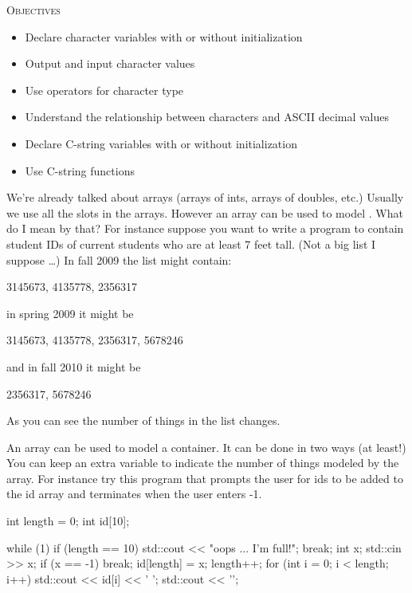 \newpage{}

\textsc{Objectives}
\begin{itemize}
\item Declare character variables with or without initialization
\item Output and input character values
\item Use operators for character type
\item Understand the relationship between characters and ASCII decimal values
\item Declare C-string variables with or without initialization
\item Use C-string functions
\end{itemize}


\newpage{}

We're already talked about arrays (arrays of ints, arrays of doubles, etc.) Usually we use all the slots in the arrays. However an array can be used to model . What do I mean by that? For instance suppose you want to write a program to contain student IDs of current students who are at least 7 feet tall. (Not a big list I suppose \ldots) In fall 2009 the list might contain:

\begin{center}
3145673, 4135778, 2356317
\end{center}

in spring 2009 it might be

\begin{center}
3145673, 4135778, 2356317, 5678246
\end{center}

and in fall 2010 it might be

\begin{center}
2356317, 5678246
\end{center}

As you can see the number of things in the list changes.

An array can be used to model a container. It can be done in two ways (at least!) You can keep an extra variable to indicate the number of things modeled by the array. For instance try this program that prompts the user for ids to be added to the id array and terminates when the user enters -1.

\begin{consolethree}[escapeinside=||]
int length = 0;
int id[10];

while (1)
{
    if (length == 10)
    {
        std::cout << "oops ... I'm full!\n";
        break;
    }
    int x;
    std::cin >> x;
    if (x == -1) break;
    id[length] = x;
    length++;
    for (int i = 0; i < length; i++)
    {
        std::cout << id[i] << ' ';
    }
    std::cout << '\n';
}
\end{consolethree}

